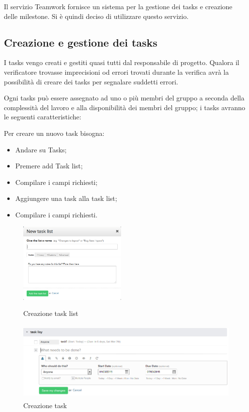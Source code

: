 Il servizio Teamwork fornisce un sistema per la gestione dei tasks e creazione delle milestone.
Si è quindi deciso di utilizzare questo servizio.\\

\subsection{Creazione e gestione dei tasks}

I tasks vengo creati e gestiti quasi tutti dal responsabile di progetto.
Qualora il verificatore trovasse imprecisioni od errori trovati durante la verifica avrà la possibilità di creare dei tasks per segnalare suddetti errori.

Ogni tasks può essere assegnato ad uno o più membri del gruppo a seconda della complessità del lavoro e alla disponibilità dei membri del gruppo; i tasks avranno le seguenti caratteristiche:

Per creare un nuovo task bisogna:

\begin{itemize}
	\item Andare su Tasks;
	\item Premere add Task list;
	\item Compilare i campi richiesti;
	\item Aggiungere una task alla task list;
	\item Compilare i campi richiesti.
\end{itemize}
 
\begin{figure}[h]
\centering
\includegraphics[height= 4cm] {./img/tasklist_fig01.png}
\caption{Creazione task list}

\includegraphics[height= 4cm] {./img/task_fig01.png}
\caption{Creazione task}
\end{figure}

